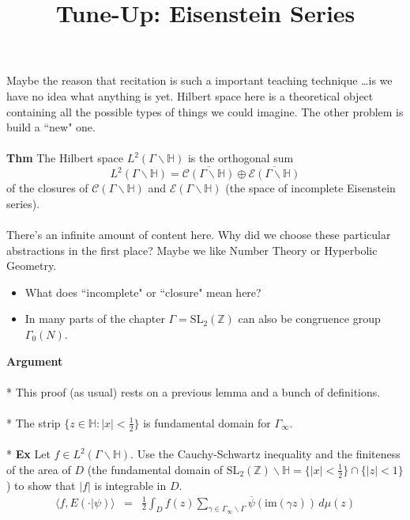 \documentclass[12pt]{article}
\title{Tune-Up: Eisenstein Series}
\date{}
\begin{document}
\sffamily

\maketitle

{\fontsize{16pt}{16pt}\selectfont 

\noindent Maybe the reason that recitation is such a important teaching technique \dots is we have no idea what anything is yet.  Hilbert space here is a theoretical object containing all the possible types of things we could imagine.  The other problem is build a ``new" one.   \\ \\
\textbf{Thm} The Hilbert space $L^2(\Gamma \backslash \mathbb{H})$ is the orthogonal sum 
$$ L^2(\Gamma \backslash \mathbb{H}) = \overline{\mathcal{C}(\Gamma \backslash \mathbb{H})} \oplus \overline{\mathcal{E}(\Gamma \backslash \mathbb{H})} $$
of the closures of $\mathcal{C}(\Gamma \backslash \mathbb{H})$ and $\mathcal{E}(\Gamma \backslash \mathbb{H})$ (the space of incomplete Eisenstein series).  \\ \\
There's an infinite amount of content here.  Why did we choose these particular abstractions in the first place?  Maybe we like Number Theory or Hyperbolic Geometry. 
\begin{itemize}
\item What does ``incomplete" or ``closure" mean here?
\item In many parts of the chapter $\Gamma = \text{SL}_2(\mathbb{Z})$ can also be congruence group $\Gamma_0(N)$.
\end{itemize}
\textbf{Argument} \\ \\
* This proof (as usual) rests on a previous lemma and a bunch of definitions.   \\ \\
* The strip $\{ z \in \mathbb{H}: |x| < \frac{1}{2} \} $ is fundamental domain for $\Gamma_\infty$. \\ \\
* \textbf{Ex} Let $f \in L^2(\Gamma \backslash \mathbb{H}) $.  Use the Cauchy-Schwartz inequality and the finiteness of the area of $D$ (the fundamental domain of $\text{SL}_2(\mathbb{Z}) \backslash \mathbb{H} = \{ |x| < \frac{1}{2} \} \cap \{ |z| < 1  \}$) to show that $|f|$ is integrable in $D$.
\begin{eqnarray*}
\langle f , E(\cdot | \psi) \rangle  &=& \frac{1}{2} \int_D f(z) \sum_{\gamma \in \Gamma_\infty \backslash \Gamma} \overline{\psi}(\text{im}(\gamma z)) \, d\mu(z)  \\ 

\end{eqnarray*}}
\end{document}
